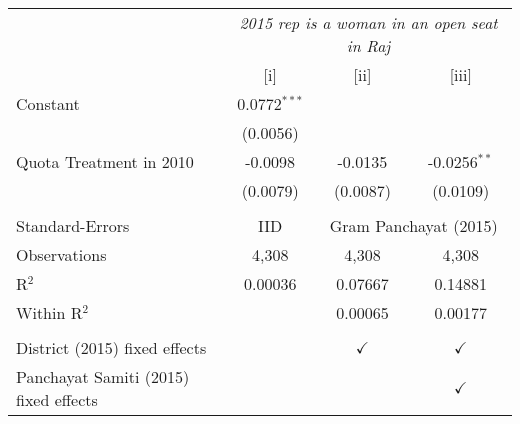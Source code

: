 
\begingroup
\centering
\begin{tabular}{lccc}
   \toprule
    & \multicolumn{3}{c}{\textit{2015 rep is a woman in an open seat in Raj}}\\
                                         & [i]            & [ii]          & [iii]\\  
   \midrule 
   Constant                              & 0.0772$^{***}$ &               &   \\   
                                         & (0.0056)       &               &   \\   
   Quota Treatment in 2010               & -0.0098        & -0.0135       & -0.0256$^{**}$\\   
                                         & (0.0079)       & (0.0087)      & (0.0109)\\   
    \\
   Standard-Errors & IID & \multicolumn{2}{c}{Gram Panchayat (2015)} \\ 
   Observations                          & 4,308          & 4,308         & 4,308\\  
   R$^2$                                 & 0.00036        & 0.07667       & 0.14881\\  
   Within R$^2$                          &                & 0.00065       & 0.00177\\  
    \\
   District (2015) fixed effects         &                & $\checkmark$  & $\checkmark$\\   
   Panchayat Samiti (2015) fixed effects &                &               & $\checkmark$\\   
   \bottomrule
\end{tabular}
\par\endgroup


